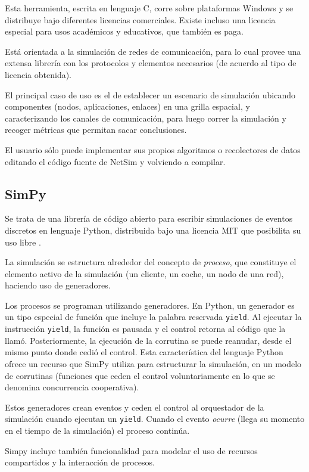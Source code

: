 Esta herramienta, escrita en lenguaje C, corre sobre plataformas Windows y se
distribuye bajo diferentes licencias comerciales. Existe incluso una licencia
especial para usos académicos y educativos, que también es paga.

Está orientada a la simulación de redes de comunicación, para lo cual provee
una extensa librería con los protocolos y elementos necesarios (de acuerdo al
tipo de licencia obtenida).

El principal caso de uso es el de establecer un escenario de simulación
ubicando componentes (nodos, aplicaciones, enlaces) en una grilla espacial, y
caracterizando los canales de comunicación, para luego correr la simulación y
recoger métricas que permitan sacar conclusiones.

El usuario sólo puede implementar sus propios algoritmos o recolectores de
datos editando el código fuente de NetSim y volviendo a compilar.

\subsection{SimPy}

Se trata de una librería de código abierto para escribir simulaciones de
eventos discretos en lenguaje Python, distribuida bajo una licencia MIT que
posibilita su uso libre \cite{sympy}.

La simulación se estructura alrededor del concepto de \textit{proceso}, que
constituye el elemento activo de la simulación (un cliente, un coche, un nodo
de una red), haciendo uso de generadores.

Los procesos se programan utilizando generadores.  En Python, un generador es
un tipo especial de función que incluye la palabra reservada \verb!yield!. Al
ejecutar la instrucción \verb!yield!, la función es pausada y el control
retorna al código que la llamó. Posteriormente, la ejecución de la corrutina se
puede reanudar, desde el mismo punto donde cedió el control. Esta
característica del lenguaje Python ofrece un recurso que SimPy utiliza para
estructurar la simulación, en un modelo de corrutinas (funciones que ceden el
control voluntariamente en lo que se denomina concurrencia cooperativa).

Estos generadores crean eventos y ceden el control al orquestador de la
simulación cuando ejecutan un \verb!yield!. Cuando el evento \textit{ocurre}
(llega su momento en el tiempo de la simulación) el proceso continúa.

Simpy incluye también funcionalidad para modelar el uso de recursos
compartidos y la interacción de procesos.

